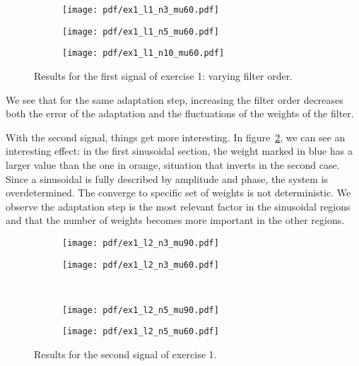 \begin{figure}[h]
    \centering
    \begin{subfigure}[t]{0.30\columnwidth}
        \centering
        \texttt{[image: pdf/ex1\_l1\_n3\_mu60.pdf]}
        \caption{}
    \end{subfigure} \hfill
    \begin{subfigure}[t]{0.30\columnwidth}
        \centering
        \texttt{[image: pdf/ex1\_l1\_n5\_mu60.pdf]}
        \caption{}
    \end{subfigure} \hfill
    \begin{subfigure}[t]{0.30\columnwidth}
        \centering
        \texttt{[image: pdf/ex1\_l1\_n10\_mu60.pdf]}
        \caption{}
    \end{subfigure}
    \caption{Results for the first signal of exercise 1: varying filter
        order.\label{fig:ex1varyorder}}
\end{figure}
We see that for the same adaptation step, increasing the filter order decreases
both the error of the adaptation and the fluctuations of the weights of the
filter.

With the second signal, things get more interesting. In
figure~\ref{fig:ex1sig2switch}, we can see an interesting effect: in the first
sinusoidal section, the weight marked in blue has a larger value than the one in
orange, situation that inverts in the second case. Since a sinusoidal is fully
described by amplitude and phase, the system is overdetermined. The converge to
specific set of weights is not deterministic. We observe the adaptation step is
the most relevant factor in the sinusoidal regions and that the number of weights
becomes more important in the other regions.
\begin{figure}
    \centering
    \begin{subfigure}[t]{0.30\columnwidth}
        \centering
        \texttt{[image: pdf/ex1\_l2\_n3\_mu90.pdf]}
        \caption{\label{fig:ex1sig2switch}}
    \end{subfigure} %
    \begin{subfigure}[t]{0.30\columnwidth}
        \centering
        \texttt{[image: pdf/ex1\_l2\_n3\_mu60.pdf]}
        \caption{}
    \end{subfigure} \\
    \begin{subfigure}[t]{0.30\columnwidth}
        \centering
        \texttt{[image: pdf/ex1\_l2\_n5\_mu90.pdf]}
        \caption{}
    \end{subfigure} %
    \begin{subfigure}[t]{0.30\columnwidth}
        \centering
        \texttt{[image: pdf/ex1\_l2\_n5\_mu60.pdf]}
        \caption{}
    \end{subfigure}
    \caption{Results for the second signal of exercise 1.\label{fig:ex1sig2}}
\end{figure}

